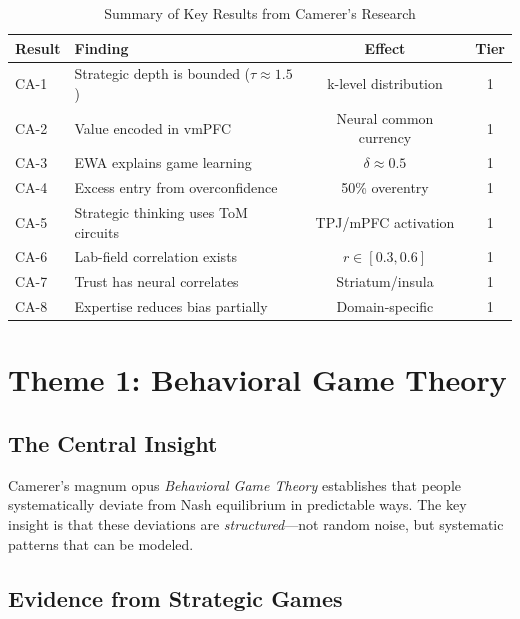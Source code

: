 \begin{table}[htbp]
\centering
\caption{Summary of Key Results from Camerer's Research}
\label{tab:ca-key-results}
\renewcommand{\arraystretch}{1.3}
\begin{tabular}{@{}llcc@{}}
\toprule
\textbf{Result} & \textbf{Finding} & \textbf{Effect} & \textbf{Tier} \\
\midrule
CA-1 & Strategic depth is bounded ($\tau \approx 1.5$) & k-level distribution & 1 \\
CA-2 & Value encoded in vmPFC & Neural common currency & 1 \\
CA-3 & EWA explains game learning & $\delta \approx 0.5$ & 1 \\
CA-4 & Excess entry from overconfidence & 50\% overentry & 1 \\
CA-5 & Strategic thinking uses ToM circuits & TPJ/mPFC activation & 1 \\
CA-6 & Lab-field correlation exists & $r \in [0.3, 0.6]$ & 1 \\
CA-7 & Trust has neural correlates & Striatum/insula & 1 \\
CA-8 & Expertise reduces bias partially & Domain-specific & 1 \\
\bottomrule
\end{tabular}
\end{table}


\section{Theme 1: Behavioral Game Theory}
\label{sec:ca-bgt}

\subsection{The Central Insight}

Camerer's magnum opus \textit{Behavioral Game Theory} \citep{PAP-camerer2003behavioral} establishes that people systematically deviate from Nash equilibrium in predictable ways. The key insight is that these deviations are \textit{structured}---not random noise, but systematic patterns that can be modeled.

\subsection{Evidence from Strategic Games}

